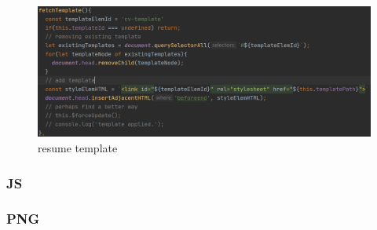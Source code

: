 \documentclass[11pt]{article}
\begin{document}
\begin{spacing}{1.0}
\begin{itemize}
 \begin{figure}[H]
	\centering
	\includegraphics[scale=.4]{figures/cssTemplate.png}
	\caption{resume template}
	\label{fig:12}
\end{figure}
		
	\end{itemize}
	\subsubsection{JS}
	\subsubsection{PNG}

\end{spacing}
\end{document}
